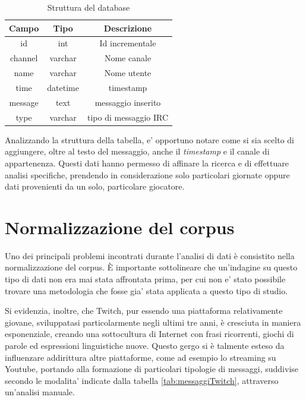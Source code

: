 \documentclass[a4paper,12pt,openright,twoside]{report}
\theoremstyle{definition}
\begin{document}
\begin{table}[h]
	\centering
	\begin{tabular}{|c|c|c|}
		\hline
		\textbf{Campo} &\textbf{ Tipo} & \textbf{Descrizione} \\
		\hline
		\hline
		id & int & Id incrementale \\
		\hline
		channel & varchar & Nome canale \\
		\hline
		name & varchar & Nome utente \\
		\hline
		time & datetime & timestamp \\
		\hline
		message & text & messaggio inserito \\
		\hline
		type & varchar & tipo di messaggio IRC \\
		\hline
	\end{tabular}
	\caption{Struttura del database}
	\label{tab:strutturaDB}
\end{table}

Analizzando la struttura della tabella, e' opportuno notare come si sia scelto di aggiungere, 
oltre al testo del messaggio, anche 
il \emph{timestamp} e il canale di appartenenza. Questi dati hanno permesso di 
affinare la ricerca e di effettuare analisi
specifiche, prendendo in considerazione
solo particolari giornate oppure dati provenienti da un solo, particolare giocatore.

\section{Normalizzazione del corpus}
Uno dei principali problemi incontrati durante l’analisi di dati è consistito 
nella normalizzazione del corpus.  \`E importante sottolineare che 
un'indagine su questo tipo di dati non era mai 
stata affrontata prima, per cui non e' stato possibile trovare una metodologia
che fosse gia' stata applicata a questo tipo di studio.

Si evidenzia, inoltre, che Twitch, pur essendo una piattaforma relativamente giovane, 
sviluppatasi particolarmente negli ultimi tre anni, 
è cresciuta in maniera esponenziale, creando una sottocultura di Internet con frasi 
ricorrenti, giochi di parole ed espressioni linguistiche nuove. 
Questo gergo si è talmente esteso da influenzare addirittura altre piattaforme, 
come ad esempio lo streaming su Youtube, portando 
alla formazione di particolari tipologie di messaggi, 
suddivise secondo le modalita' indicate dalla tabella \ref{tab:messaggiTwitch},  attraverso un'analisi manuale.
\end{document}
